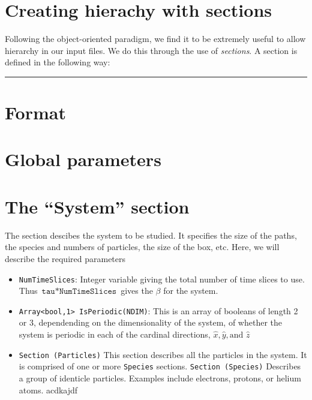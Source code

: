 \documentclass{book}
\begin{document}
\section{Creating hierachy with sections}
Following the object-oriented paradigm, we find it to be extremely
useful to allow hierarchy in our input files.  We do this through the
use of {\em sections}.  A section is defined in the following way:\\
\rule{0.6cm}{0cm}

\section{Format}
\section{Global parameters}
\section{The ``System'' section}
   The section descibes the system to be studied.  It specifies the
   size of the paths, the species and numbers of particles, the size
   of the box, etc.  Here, we will describe the required parameters
\begin{itemize}
   \item \texttt{NumTimeSlices}:  Integer variable giving the total
   number of time slices to use.  Thus
   $\texttt{tau}*\texttt{NumTimeSlices}$ gives the $\beta$ for the
   system.
   \item \texttt{Array<bool,1> IsPeriodic(NDIM)}:  This is an array of
   booleans of length 2 or 3, dependending on the dimensionality of
   the system, of whether the system is periodic in each of the
   cardinal directions, $\hat{x},\hat{y},\text{and } \hat{z}$
   \item \texttt{Section (Particles)}  This section describes all the
   particles in the system.  It is comprised of one or more
   \texttt{Species} sections.
     \subitem \texttt{Section (Species)}  Describes a group of
        identicle particles.  Examples include electrons, protons,
        or helium atoms.
        \subsubitem acdkajdf
\end{itemize}
\end{document}
